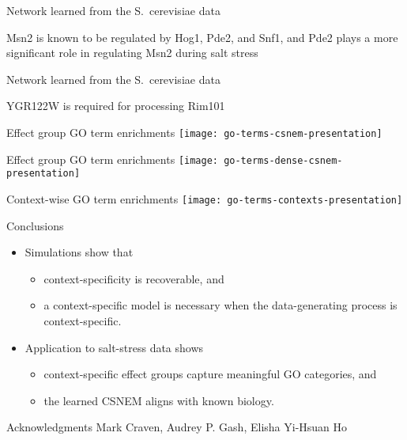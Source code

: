 \documentclass[aspectratio=169]{beamer}
\begin{document}

\begin{frame}{Network learned from the S.\ cerevisiae data}

\vfill

Msn2 is known to be regulated by Hog1, Pde2, and Snf1, and Pde2 plays a more significant role in regulating Msn2 during salt stress
\end{frame}


\begin{frame}{Network learned from the S.\ cerevisiae data}

\vfill

YGR122W is required for processing Rim101
\end{frame}


\begin{frame}{Effect group GO term enrichments}
\centering
\texttt{[image: go-terms-csnem-presentation]}
\end{frame}

\begin{frame}{Effect group GO term enrichments}
\centering
\texttt{[image: go-terms-dense-csnem-presentation]}
\end{frame}



\begin{frame}{Context-wise GO term enrichments}
\texttt{[image: go-terms-contexts-presentation]}
\end{frame}


\begin{frame}{Conclusions}
 \begin{itemize}
  \item Simulations show that
  \begin{itemize}
   \item context-specificity is recoverable, and
   \item a context-specific model is necessary when the data-generating process is context-specific.
  \end{itemize}
  \item Application to salt-stress data shows
  \begin{itemize}
   \item context-specific effect groups capture meaningful GO categories, and
   \item the learned CSNEM aligns with known biology.
  \end{itemize}
 \end{itemize}
 \pause
 \begin{block}{Acknowledgments}
   Mark Craven, Audrey P. Gash, Elisha Yi-Hsuan Ho %
 \end{block}
\end{frame}
\end{document}
